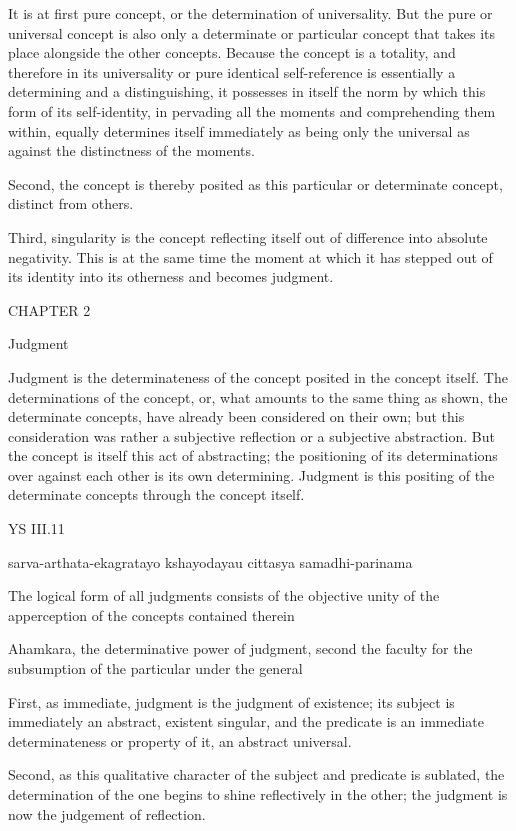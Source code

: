 It is at first pure concept,
or the determination of universality.
But the pure or universal concept is also
only a determinate or particular concept
that takes its place alongside the other concepts.
Because the concept is a totality,
and therefore in its universality
or pure identical self-reference
is essentially a determining and a distinguishing,
it possesses in itself the norm
by which this form of its self-identity,
in pervading all the moments
and comprehending them within,
equally determines itself immediately
as being only the universal
as against the distinctness of the moments.

Second, the concept is thereby posited
as this particular or determinate concept,
distinct from others.

Third, singularity is the concept reflecting itself
out of difference into absolute negativity.
This is at the same time the moment at which
it has stepped out of its identity
into its otherness and becomes judgment.

CHAPTER 2

Judgment

Judgment is the determinateness of the concept
posited in the concept itself.
The determinations of the concept,
or, what amounts to the same thing as shown,
the determinate concepts,
have already been considered on their own;
but this consideration was rather
a subjective reflection
or a subjective abstraction.
But the concept is itself this act of abstracting;
the positioning of its determinations over
against each other is its own determining.
Judgment is this positing of the determinate concepts
through the concept itself.

YS III.11

    sarva-arthata-ekagratayo kshayodayau cittasya samadhi-parinama

    The logical form of all judgments consists of the objective unity
    of the apperception of the concepts contained therein

    Ahamkara, the determinative power of judgment,
    second the faculty for the subsumption of the particular under the general

First, as immediate, judgment is the judgment of existence;
its subject is immediately an abstract, existent singular,
and the predicate is an immediate determinateness or property of it,
an abstract universal.

Second, as this qualitative character of
the subject and predicate is sublated,
the determination of the one begins
to shine reflectively in the other;
the judgment is now the judgement of reflection.

